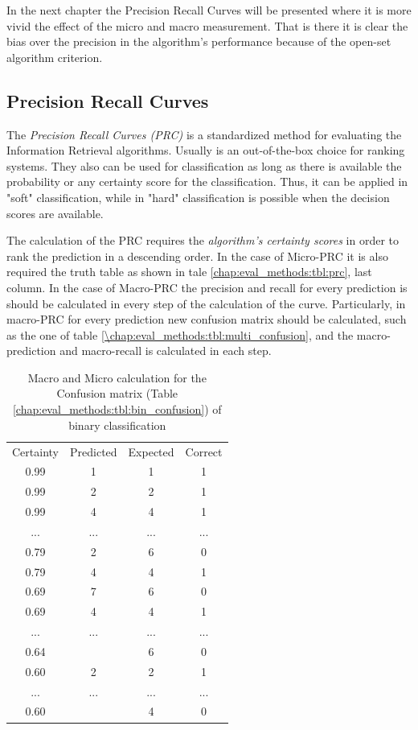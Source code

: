 In the next chapter the Precision Recall Curves will be presented where it is more vivid the effect of the micro and macro measurement. That is there it is clear the bias over the precision in the algorithm's performance because of the open-set algorithm criterion.


\subsection{Precision Recall Curves}\label{chap:eval_methods:sec:roc_prc}

The \textit{Precision Recall Curves (PRC)} is a standardized method for evaluating the Information Retrieval algorithms. Usually is an out-of-the-box choice for ranking systems. They also can be used for classification as long as there is available the probability or any certainty score for the classification. Thus, it can be applied in "soft" classification, while in "hard" classification is possible when the decision scores are available. 

The calculation of the PRC requires the \textit{algorithm's certainty scores} in order to rank the prediction in a descending order. In the case of Micro-PRC it is also required the truth table as shown in tale \ref{chap:eval_methods:tbl:prc}, last column. In the case of Macro-PRC the precision and recall for every prediction is should be calculated in every step of the calculation of the curve. Particularly, in macro-PRC for every prediction new confusion matrix should be calculated, such as the one of table \ref{\chap:eval_methods:tbl:multi_confusion}, and the macro-prediction and macro-recall is calculated in each step.


\begin{table}[H]\label{chap:eval_methods:tbl:prc}
	\center
	\caption{Macro and Micro calculation for the Confusion matrix (Table \ref{chap:eval_methods:tbl:bin_confusion}) of binary classification}\label{chap:eval_methods:tbl:bin_macro_vs_micro}
	\begin{tabular}{|c|c|c|c|}
		\cline{1-4}
		Certainty & Predicted & Expected & Correct\\
		\cline{1-4}
		0.99 & 1 & 1 & 1 \\
		0.99 & 2 & 2 & 1 \\
		0.99 & 4 & 4 & 1 \\
		... & ... & ... & ... \\
		0.79 & 2 & 6 & 0 \\
		0.79 & 4 & 4 & 1 \\
		0.69 & 7 & 6 & 0 \\
		0.69 & 4 & 4 & 1 \\
		... & ... & ... & ... \\
		0.64 & \emptyset & 6 & 0 \\
		0.60 & 2 & 2 & 1 \\
		... & ... & ... & ... \\
		0.60 & \emptyset & 4 & 0 \\
		\cline{1-4}
	\end{tabular}
\end{table}

